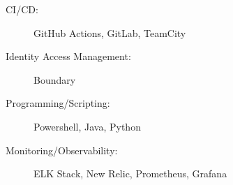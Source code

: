 \begin{minipage}[t]{.5\linewidth}
  \begin{description}
    \item[CI/CD:] GitHub Actions, GitLab, TeamCity
  \end{description}
\end{minipage}%
\hfil
\begin{minipage}[t]{.5\linewidth}
  \begin{description}
    \item[Identity Access Management:] Boundary
  \end{description}
\end{minipage}

\begin{minipage}[t]{.8\linewidth}
  \begin{description}
    \item[Programming/Scripting:] Powershell, Java, Python
  \end{description}
\end{minipage}

\begin{minipage}[t]{.8\linewidth}
  \begin{description}
    \item[Monitoring/Observability:] ELK Stack, New Relic, Prometheus, Grafana
  \end{description}
\end{minipage}
